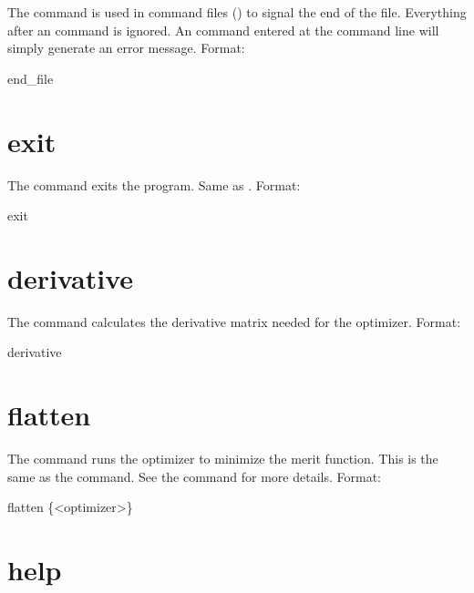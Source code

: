 The  command is used in command files
() to signal the end of the file. Everything
after an  command is ignored. An  command
entered at the command line will simply generate an error message.
Format:
\begin{example}
  end_file
\end{example}

\section{exit}
\label{s:exit}

The  command exits the program. Same as .  Format:
\begin{example}
  exit
\end{example}

\section{derivative}
\label{s:deriv}

The  command calculates the  derivative
matrix needed for the  optimizer.
Format:
\begin{example}
  derivative
\end{example}

\section{flatten}
\label{s:flatten}

The  command runs the optimizer to minimize the merit
function. This is the same as the  command. 
See the  command for more details.  Format:
\begin{example}
  flatten \{<optimizer>\}
\end{example}

\vskip 0.2in

\section{help}
\label{s:help}

